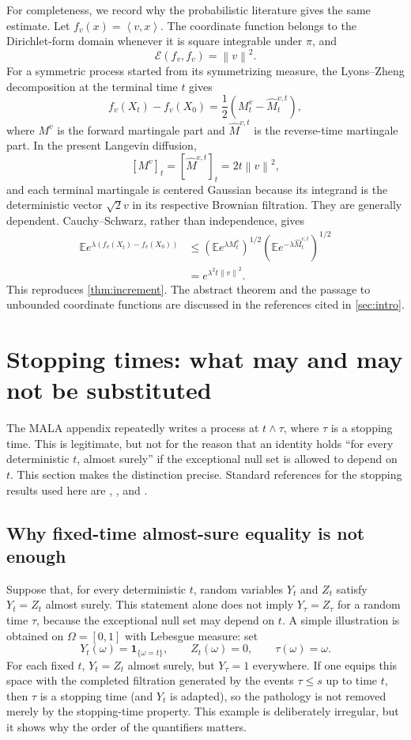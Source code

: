 \documentclass[11pt]{article}
\newcommand{\E}{\mathbb E}
\newcommand{\cE}{\mathcal E}
\newcommand{\ip}[2]{\left\langle #1,#2\right\rangle}
\newcommand{\norm}[1]{\left\lVert #1\right\rVert}
\newcommand{\1}{\mathbf 1}
\begin{document}
For completeness, we record why the probabilistic literature gives the same
estimate.  Let \(f_v(x)=\ip{v}{x}\).  The coordinate function belongs to the
Dirichlet-form domain whenever it is square integrable under \(\pi\), and
\[
 \cE(f_v,f_v)=\norm v^2.
\]
For a symmetric process started from its symmetrizing measure, the
Lyons--Zheng decomposition at the terminal time \(t\) gives
\[
 f_v(X_t)-f_v(X_0)
 =\frac12\left(M_t^v-\widehat M_t^{v,t}\right),
\]
where \(M^v\) is the forward martingale part and
\(\widehat M^{v,t}\) is the reverse-time martingale part.  In the present
Langevin diffusion,
\[
 [M^v]_t=[\widehat M^{v,t}]_t=2t\norm v^2,
\]
and each terminal martingale is centered Gaussian because its integrand is
the deterministic vector \(\sqrt2v\) in its respective Brownian filtration.
They are generally dependent.  Cauchy--Schwarz, rather than independence,
gives
\begin{align*}
 \E e^{\lambda(f_v(X_t)-f_v(X_0))}
 &\leq
 \left(\E e^{\lambda M_t^v}\right)^{1/2}
 \left(\E e^{-\lambda\widehat M_t^{v,t}}\right)^{1/2}\\
 &=e^{\lambda^2t\norm v^2}.
\end{align*}
This reproduces \cref{thm:increment}.  The abstract theorem and the passage
to unbounded coordinate functions are discussed in the references cited in
\cref{sec:intro}.

\section{Stopping times: what may and may not be substituted}\label{sec:stopping}

The MALA appendix repeatedly writes a process at \(t\wedge\tau\), where
\(\tau\) is a stopping time.  This is legitimate, but not for the reason
that an identity holds ``for every deterministic \(t\), almost surely'' if
the exceptional null set is allowed to depend on \(t\).  This section makes
the distinction precise.  Standard references for the stopping results
used here are \citet[Chapter~3]{KaratzasShreve1991},
\citet[Chapter~IV]{RevuzYor1999}, and
\citet[Chapter~II]{Protter2005}.

\subsection{Why fixed-time almost-sure equality is not enough}

Suppose that, for every deterministic \(t\), random variables \(Y_t\) and
\(Z_t\) satisfy \(Y_t=Z_t\) almost surely.  This statement alone does not
imply \(Y_\tau=Z_\tau\) for a random time \(\tau\), because the exceptional
null set may depend on \(t\).  A simple illustration is obtained on
\(\Omega=[0,1]\) with Lebesgue measure: set
\[
 Y_t(\omega)=\1_{\{\omega=t\}},\qquad Z_t(\omega)=0,
 \qquad \tau(\omega)=\omega.
\]
For each fixed \(t\), \(Y_t=Z_t\) almost surely, but
\(Y_\tau=1\) everywhere.  If one equips this space with the completed
filtration generated by the events \({\tau\leq s}\) up to time \(t\), then
\(\tau\) is a stopping time (and \(Y_t\) is adapted), so the pathology is
not removed merely by the stopping-time property.  This example is
deliberately irregular, but it shows why the order of the quantifiers
matters.
\end{document}
